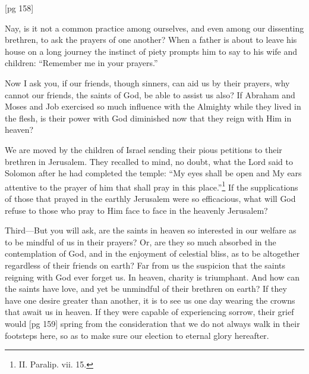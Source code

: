 [pg 158]

Nay, is it not a common practice among ourselves,
and even among our dissenting brethren, to
ask the prayers of one another? When a father
is about to leave his house on a long journey the
instinct of piety prompts him to say to his wife
and children: “Remember me in your prayers.”

Now I ask you, if our friends, though sinners,
can aid us by their prayers, why cannot our
friends, the saints of God, be able to assist us
also? If Abraham and Moses and Job exercised
so much influence with the Almighty while they
lived in the flesh, is their power with God diminished
now that they reign with Him in heaven?

We are moved by the children of Israel sending
their pious petitions to their brethren in Jerusalem.
They recalled to mind, no doubt, what the
Lord said to Solomon after he had completed the
temple: “My eyes shall be open and My ears attentive
to the prayer of him that shall pray in this
place.”\footnote{II. Paralip. vii.
15.} If the supplications of those that prayed
in the earthly Jerusalem were so efficacious, what
will God refuse to those who pray to Him face to
face in the heavenly Jerusalem?

Third—But you will ask, are the saints in heaven
so interested in our welfare as to be mindful of us
in their prayers? Or, are they so much absorbed
in the contemplation of God, and in the enjoyment
of celestial bliss, as to be altogether regardless of
their friends on earth? Far from us the suspicion
that the saints reigning with God ever forget us.
In heaven, charity is triumphant. And how can
the saints have love, and yet be unmindful of their
brethren on earth? If they have one desire greater
than another, it is to see us one day wearing the
crowns that await us in heaven. If they were capable
of experiencing sorrow, their grief would
[pg 159]
spring from the consideration that we do not always
walk in their footsteps here, so as to make
sure our election to eternal glory hereafter.

